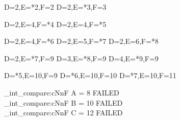 \begin{CDRBlock} [
  tags={E,F},
]
D=2,E=*2,F=2
D=2,E=*3,F=3
\end{CDRBlock}

\begin{CDRBlock} [
  tags=F,
]
D=2,E=4,F=*4
D=2,E=4,F=*5
\end{CDRBlock}

\begin{CDRBlock} [
  tags={F, E},
]
D=2,E=4,F=*6
D=2,E=5,F=*7
D=2,E=6,F=*8
\end{CDRBlock}

\begin{CDRBlock} [
  tags={E, D},
]
D=2,E=*7,F=9
D=3,E=*8,F=9
D=4,E=*9,F=9
\end{CDRBlock}
\begin{CDRBlock} [
  tags={D,F},
]
D=*5,E=10,F=9
D=*6,E=10,F=10
D=*7,E=10,F=11
\end{CDRBlock}

\ExplSyntaxOn
\CDR_int_compare:cNnF { A } = 8 { FAILED \\ }
\CDR_int_compare:cNnF { B } = {10} { FAILED \\ }
\CDR_int_compare:cNnF { C } = {12} { FAILED \\ }
\ExplSyntaxOff

\egroup

